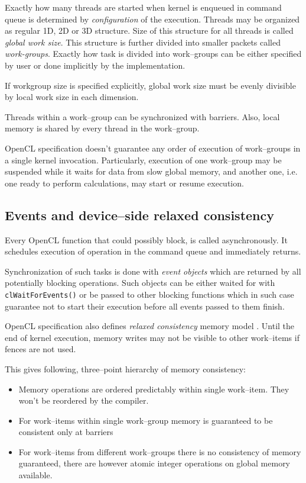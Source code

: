 Exactly how many threads are started when kernel is enqueued in command queue
is determined by \emph{configuration} of the execution. Threads may be organized
as regular 1D, 2D or 3D structure. Size of this structure for all threads is
called \emph{global work size}. This structure is further divided into smaller
packets called \emph{work-groups}. Exactly how task is divided into work--groups
can be either specified by user or done implicitly by the implementation.

If workgroup size is specified explicitly, global work size must be evenly
divisible by local work size in each dimension.

Threads within a work--group can be synchronized with barriers. Also, local
memory is shared by every thread in the work--group.

OpenCL specification doesn't guarantee any order of execution of work--groups
in a single kernel invocation. Particularly, execution of one work--group may be
suspended while it waits for data from slow global memory, and another one,
i.e. one ready to perform calculations, may start or resume execution.

\subsection{Events and device--side relaxed consistency}
\label{sub:clevents}

Every OpenCL function that could possibly block, is called asynchronously. It
schedules execution of operation in the command queue and immediately returns.

Synchronization of such tasks is done with \emph{event objects} which are
returned by all potentially blocking operations. Such objects can be either
waited for with \texttt{clWaitForEvents()} or be passed to other blocking
functions which in such case guarantee not to start their execution before all
events passed to them finish.

OpenCL specification also defines \emph{relaxed consistency} memory model \parencite[pp. 114--115]{gaster2012heterogeneous}.
Until the end of kernel execution, memory writes may not be visible to other
work--items if fences are not used.

This gives following, three--point hierarchy of memory consistency:
\begin{itemize}
  \item Memory operations are ordered predictably within single work--item. They
    won't be reordered by the compiler.
  \item For work--items within single work--group memory is guaranteed to be
    consistent only at barriers
  \item For work--items from different work--groups there is no consistency of
    memory guaranteed, there are however atomic integer operations on global
    memory available.
\end{itemize}

